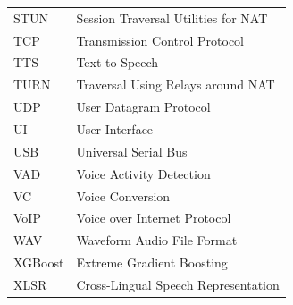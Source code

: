 \begin{longtable}{@{}p{5cm} p{11cm}}
STUN      & Session Traversal Utilities for NAT \\[0.2cm]
TCP       & Transmission Control Protocol \\[0.2cm]
TTS       & Text-to-Speech \\[0.2cm]
TURN      & Traversal Using Relays around NAT \\[0.2cm]
UDP       & User Datagram Protocol \\[0.2cm]
UI        & User Interface \\[0.2cm]
USB       & Universal Serial Bus \\[0.2cm]
VAD       & Voice Activity Detection \\[0.2cm]
VC        & Voice Conversion \\[0.2cm]
VoIP      & Voice over Internet Protocol \\[0.2cm]
WAV       & Waveform Audio File Format \\[0.2cm]
XGBoost   & Extreme Gradient Boosting \\[0.2cm]
XLSR      & Cross-Lingual Speech Representation \\[0.2cm]

\end{longtable}